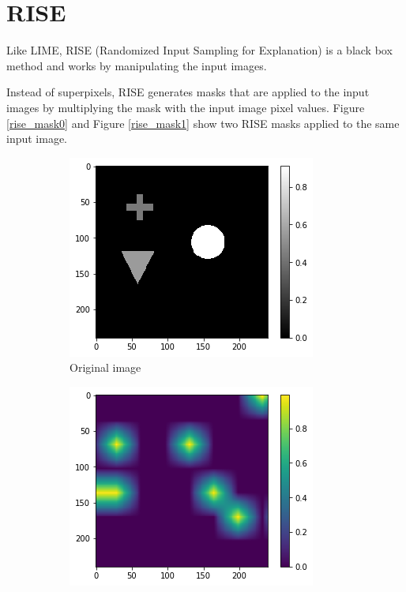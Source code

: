 \section{RISE}

Like LIME, RISE \cite{Petsiuk2018rise} (Randomized Input Sampling for Explanation) is a black box method and works by manipulating the input images.

Instead of superpixels, RISE generates masks that are applied to the input images by multiplying the mask with the input image pixel values. Figure \ref{rise_mask0} and Figure \ref{rise_mask1} show two RISE masks applied to the same input image.

\begin{figure}[H]
    \centering
    \begin{subfigure}[t]{.32\textwidth}
        \centering
        \includegraphics[width=\linewidth]{chapters/02_methods/images/rise/rise_original.png}
        \caption{Original image}
    \end{subfigure}\hfill%
    \begin{subfigure}[t]{.32\textwidth}
        \centering
        \includegraphics[width=\linewidth]{chapters/02_methods/images/rise/rise0_mask.png}

\end{subfigure}
\end{figure}
